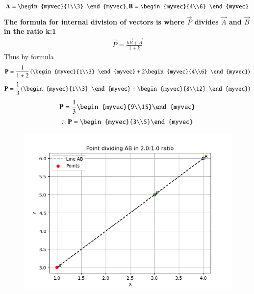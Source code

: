 \documentclass[journal]{IEEEtran}
\begin{document}
	\begin{align*}
		\vec{A} = \begin{myvec}{1\\3} \end{myvec} , \vec{B} = \begin{myvec}{4\\6} \end{myvec}
	\end{align*}
	\textbf{The formula for internal division of vectors is where $\vec{P}$ divides $\vec{A}$ and $\vec{B}$ in the ratio k:1}
	\begin{align*}
	\vec{P} =	\frac{k\vec{B} + \vec{A}}{1+k} 
	\end{align*}
	Thus by formula
	\begin{align*}
	\vec{P} = \frac{1}{1+2}\brak{\begin{myvec}{1\\3} \end{myvec}+2\begin{myvec}{4\\6} \end{myvec}}
	\end{align*}
	\begin{align*}
		\vec{P} = \frac{1}{3}\brak{\begin{myvec}{1\\3} \end{myvec}+\begin{myvec}{8\\12} \end{myvec}}
	\end{align*}
	\begin{align*}
		\vec{P} = \frac{1}{3}\begin{myvec}{9\\15}\end{myvec}
	\end{align*}
	\begin{align*}
	\therefore	\vec{P} = \begin{myvec}{3\\5}\end{myvec}
	\end{align*}

\begin{figure}[H]
	\centering
	\includegraphics[width = 0.8\columnwidth]{q1.1.png}
	\caption*{}
	\label{q1.1}
\end{figure}
\end{document}
